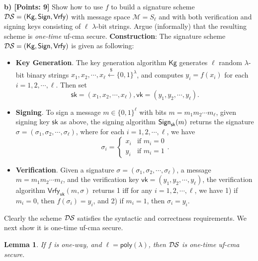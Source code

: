 \documentclass[12pt]{article}
\newcommand{\bits}{\{0,1\}}
\newcommand{\getsr}{\stackrel{\$}{\gets}}
\newcommand{\Vrfy}{\textsf{Vrfy}}
\newcommand{\M}{\mathcal{M}}
\newtheorem{lemma}[theorem]{Lemma}
\theoremstyle{definition}
\newcommand{\Kg}{\textsf{Kg}}
\newcommand{\sk}{\textsf{sk}}
\begin{document}
\newcommand{\vk}{\textsf{vk}}
{\bf b) [Points: 9]} Show how to use $f$ to build a signature scheme $\DS = (\Kg, \Sign, \Vrfy)$ with message space $\M = S_{\ell}$ and with both verification and signing keys consisting of $\ell$ $\lambda$-bit strings. Argue (informally) that the resulting scheme is \emph{one-time} uf-cma secure.
{\bf Construction}: 
The signature scheme $\DS = (\Kg, \Sign, \Vrfy)$ is given as following:
\begin{itemize}
\item {\bf Key Generation}. The key generation algorithm $\Kg$ generates $\ell$ random $\lambda$-bit binary strings $x_1, x_2, \cdots, x_{\ell} \getsr \bits^\lambda$, and computes $y_i = f(x_i)$ for each $i=1,2,\cdots,\ell$. Then set
$$\sk = (x_1,x_2,\cdots,x_{\ell}), \vk = (y_1, y_2,\cdots,y_{\ell}).$$
\item {\bf Signing}. To sign a message $m \in \bits^\ell$ with bits $m=m_1m_2\cdots m_{\ell}$, given signing key $\sk$ as above, the signing algorithm $\Sign_{\sk}(m)$ returns the signature $\sigma = (\sigma_1, \sigma_2, \cdots, \sigma_\ell)$, where for each $i=1,2,\cdots, \ell$, we have 
$$\sigma_i = \begin{cases}
x_i & \textrm{if $m_i=0$} \\
y_i & \textrm{if $m_i=1$}
\end{cases}.$$
\item {\bf Verification}. Given a signature $\sigma = (\sigma_1, \sigma_2, \cdots, \sigma_\ell)$, a message $m = m_1m_2\cdots m_{\ell}$, and the verification key $\vk = (y_1,y_2,\cdots, y_{\ell})$, the verification algorithm $\Vrfy_{\vk}(m,\sigma)$ returns 1 iff for any $i=1,2,\cdots, \ell$, we have 1) if $m_i=0$, then $f(\sigma_i) = y_i$, and 2) if $m_i=1$, then $\sigma_i = y_i$.
\end{itemize}
Clearly the scheme $\mathcal{DS}$ satisfies the syntactic and correctness requirements. We next show it is one-time uf-cma secure.
\newcommand{\poly}{\mathsf{poly}}
\begin{lemma}
If $f$ is one-way, and $\ell = \poly(\lambda)$, then $\mathcal{DS}$ is one-time uf-cma secure.
\end{lemma}
\newcommand{\SO}{\textsf{S}}
\end{document}
